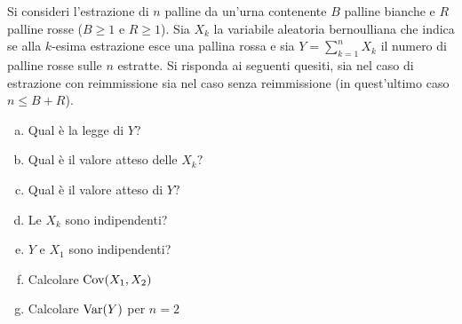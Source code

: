 Si consideri l'estrazione di $n$ palline da un'urna contenente $B$ palline bianche e $R$ palline rosse ($B\geq 1$ e $R\geq 1$). Sia $X_{k}$ la variabile aleatoria bernoulliana che indica se alla $k$-esima estrazione esce una pallina rossa e sia $Y=\sum_{k=1}^{n} X_{k}$ il numero di palline rosse sulle $n$ estratte. Si risponda ai seguenti quesiti, sia nel caso di estrazione con reimmissione sia nel caso senza reimmissione (in quest'ultimo caso $n\leq B+R$).
\begin{enumerate}[a)]
	\item Qual è la legge di $Y$?
	\item Qual è il valore atteso delle $X_{k} ?$
	\item Qual è il valore atteso di $Y?$
	\item Le $X_{k}$ sono indipendenti?
	\item $Y$ e $X_{1}$ sono indipendenti?
	\item Calcolare $\operatorname{Cov}(X_{1} ,X_{2})$
	\item Calcolare $\operatorname{Var} (Y)$ per $n=2$
\end{enumerate}

\Esercizio{}

